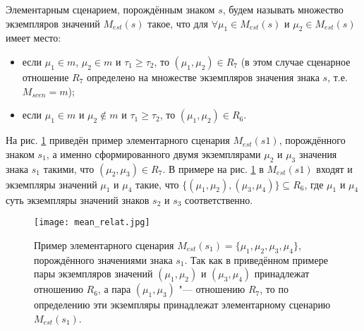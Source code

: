 Элементарным сценарием, порождённым знаком $s$, будем называть множество экземпляров значений $M_{est}(s)$ такое, что для $\forall\mu_1\in M_{est}(s)$ и $\mu_2\in M_{est}(s)$ имеет место:
\begin{itemize}
	\item если $\mu_1\in m$, $\mu_2\in m$ и $\tau_1\geqslant\tau_2$, то $(\mu_1,\mu_2)\in R_7$ (в этом случае сценарное отношение $R_7$ определено на множестве экземпляров значения знака $s$, т.е. $M_{scen}=m$);
	\item если $\mu_1\in m$ и $\mu_2\not\in m$ и $\tau_1\geqslant\tau_2$, то $(\mu_1,\mu_2)\in R_6$.
\end{itemize}

На рис. \ref{fg:mean_relat} приведён пример элементарного сценария $M_{est}(s1)$, порождённого знаком $s_1$, а именно сформированного двумя экземплярами $\mu_2$ и $\mu_3$ значения знака $s_1$ такими, что $(\mu_2,\mu_3)\in R_7$. В примере на рис. \ref{fg:mean_relat} в $M_{est}(s1)$ входят и экземпляры значений $\mu_1$ и $\mu_4$ такие, что $\{(\mu_1,\mu_2),(\mu_3,\mu_4)\}\subseteq R_6$, где $\mu_1$ и $\mu_4$ суть экземпляры значений знаков $s_2$ и $s_3$ соответственно.

\begin{figure}[h]
	\centering
	\texttt{[image: mean\_relat.jpg]}
	\caption{Пример элементарного сценария $M_{est}(s_1)=\{\mu_1,\mu_2,\mu_3,\mu_4\}$, порождённого значениями знака $s_1$. Так как в приведённом примере пары экземпляров значений $(\mu_1,\mu_2)$ и $(\mu_3,\mu_4)$ принадлежат отношению $R_6$, а пара $(\mu_1,\mu_3)$ "--- отношению $R_7$, то по определению эти экземпляры принадлежат элементарному сценарию $M_{est}(s_1)$.}
	\label{fg:mean_relat}
\end{figure}


\clearpage